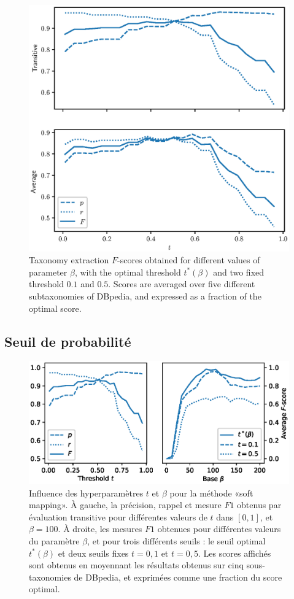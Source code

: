 \begin{figure}
    \centering
    \includegraphics{fig/plot/threshold_exp.eps}
    \caption{Taxonomy extraction $F$-scores obtained for different values of parameter $\beta$, with the optimal threshold $t^*(\beta)$ and two fixed threshold $0.1$ and $0.5$. Scores are averaged over five different subtaxonomies of DBpedia, and expressed as a fraction of the optimal score.}
    \label{fig:beta-search-2}
\end{figure}

\subsection{Seuil de probabilité}

\begin{figure}
    \centering
    \includegraphics[width=\textwidth]{fig/plot/hp_results.eps}
    \caption{Influence des hyperparamètres $t$ et $\beta$ pour la méthode «soft mapping». À gauche, la précision, rappel et mesure $F1$ obtenus par évaluation transitive pour différentes valeurs de $t$ dans $[0, 1]$, et $\beta = 100$. À droite, les mesures $F1$ obtenues pour différentes valeurs du paramètre $\beta$, et pour trois différents seuils : le seuil optimal $t^*(\beta)$ et deux seuils fixes $t=0,1$ et $t=0,5$. Les scores affichés sont obtenus en moyennant les résultats obtenus sur cinq sous-taxonomies de DBpedia, et exprimées comme une fraction du score optimal.
    }
    \label{fig:t-search-1}
\end{figure}

